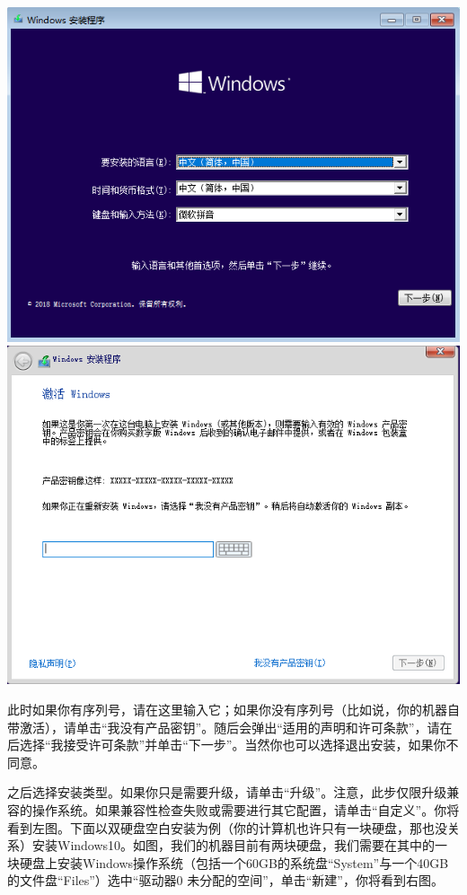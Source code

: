 \begin{center}
	\includegraphics[scale=0.45]{pic/win10setup2}	\includegraphics[scale=0.45]{pic/win10setup3}
\end{center} \par
此时如果你有序列号，请在这里输入它；如果你没有序列号（比如说，你的机器自带激活），请单击“我没有产品密钥”。随后会弹出“适用的声明和许可条款”，请在{\color{red}{仔细阅读}}后选择“我接受许可条款”并单击“下一步”。当然你也可以选择退出安装，如果你不同意。\par
之后选择安装类型。如果你只是需要升级，请单击“升级”。注意，此步仅限升级兼容的操作系统。如果兼容性检查失败或需要进行其它配置，请单击“自定义”。你将看到左图。下面以双硬盘空白安装为例（你的计算机也许只有一块硬盘，那也没关系）安装Windows10。如图，我们的机器目前有两块硬盘，我们需要在其中的一块硬盘上安装Windows操作系统（包括一个60GB的系统盘“System”与一个40GB的文件盘“Files”）选中“驱动器0 未分配的空间”，单击“新建”，你将看到右图。
